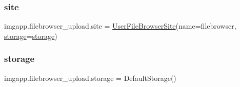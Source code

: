 \subsubsection{\texorpdfstring{site}{site}}
{\footnotesize\ttfamily imgapp.\+filebrowser\+\_\+upload.\+site = \hyperlink{classimgapp_1_1filebrowser__upload_1_1UserFileBrowserSite}{User\+File\+Browser\+Site}(name=\textquotesingle{}filebrowser\textquotesingle{}, \hyperlink{namespaceimgapp_1_1filebrowser__upload_ae26049c70fbfba51dec84d62840e6a01}{storage}=\hyperlink{namespaceimgapp_1_1filebrowser__upload_ae26049c70fbfba51dec84d62840e6a01}{storage})}

\mbox{\label{namespaceimgapp_1_1filebrowser__upload_ae26049c70fbfba51dec84d62840e6a01}} 
\subsubsection{\texorpdfstring{storage}{storage}}
{\footnotesize\ttfamily imgapp.\+filebrowser\+\_\+upload.\+storage = Default\+Storage()}

